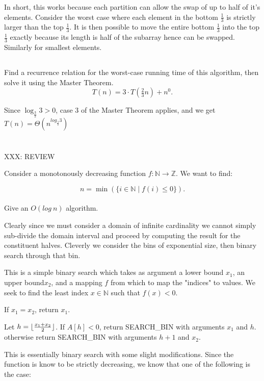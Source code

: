 \documentclass{amsart}
\theoremstyle{definition}
\theoremstyle{remark}
\numberwithin{equation}{section}
\newcommand{\NN}{\mathbb N}
\newcommand{\ZZ}{\mathbb Z}
\DeclarePairedDelimiter{\floor}{\lfloor}{\rfloor}
\begin{document}
In short, this works because each partition can allow the swap of up to
half of it's elements. Consider the worst case where each element in the
bottom $\frac{1}{3}$ is strictly larger than the top $\frac{1}{3}$. It
is then possible to move the entire bottom $\frac{1}{3}$ into the top
$\frac{1}{3}$ exactly because its length is half of the subarray hence
can be swapped. Similarly for smallest elements.

\subsection{} Find a recurrence relation for the worst-case running time of this algorithm, then solve it using the Master Theorem.
$$ T(n) = 3 \cdot T( \tfrac{2}{3} n) + n^0. $$

Since $\log_{\frac{3}{2}} {3} > 0$, case 3 of the Master Theorem applies, and we get
$T(n) = \Theta ( n^{log_{\frac{3}{2}} {3}} )$

\section{} 
XXX: REVIEW

Consider a monotonously decreasing function $f : \NN \rightarrow \ZZ$. We want to find:

$$ n = \min (\{i \in \NN \mid f(i) \leq 0 \}).$$ \\ 

Give an $O(log\ n)$ algorithm.

Clearly since we must consider a domain of infinite cardinality we cannot simply sub-divide the domain interval and proceed by computing the result for the constituent halves. Cleverly we consider the bins of exponential size, then binary search through that bin.


This is a simple binary search which takes as argument a lower bound
$x_1$, an upper bound$x_2$, and a mapping $f$ from which to map the
"indices" to values. We seek to find the least index $x \in \NN$ such
that $f(x) < 0$.

If $x_1 = x_2$, return $x_1$.

Let $h = \floor{\tfrac{x_1 + x_2}{2}}$. If $A[h] < 0$, return
SEARCH\_BIN with arguments $x_1$ and $h$. otherwise return 
SEARCH\_BIN with arguments $h+1$ and $x_2$.

\proof

This is essentially binary search with some slight modifications.
Since the function is know to be strictly decreasing, we know that
one of the following is the case:
\end{document}
